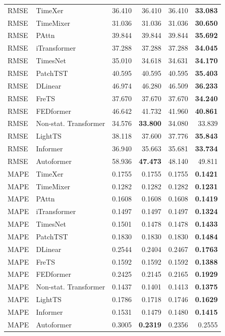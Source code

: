 \begin{longtable}{llrrrr}
\midrule
RMSE & TimeXer & 36.410 & 36.410 & 36.410 & \textbf{33.083} \\
RMSE & TimeMixer & 31.036 & 31.036 & 31.036 & \textbf{30.650} \\
RMSE & PAttn & 39.844 & 39.844 & 39.844 & \textbf{35.692} \\
RMSE & iTransformer & 37.288 & 37.288 & 37.288 & \textbf{34.045} \\
RMSE & TimesNet & 35.010 & 34.618 & 34.631 & \textbf{34.170} \\
RMSE & PatchTST & 40.595 & 40.595 & 40.595 & \textbf{35.403} \\
RMSE & DLinear & 46.974 & 46.280 & 46.509 & \textbf{36.233} \\
RMSE & FreTS & 37.670 & 37.670 & 37.670 & \textbf{34.240} \\
RMSE & FEDformer & 46.642 & 41.732 & 41.960 & \textbf{40.861} \\
RMSE & Non-stat. Transformer & 34.576 & \textbf{33.800} & 34.080 & 33.839 \\
RMSE & LightTS & 38.118 & 37.600 & 37.776 & \textbf{35.843} \\
RMSE & Informer & 36.940 & 35.663 & 35.681 & \textbf{33.734} \\
RMSE & Autoformer & 58.936 & \textbf{47.473} & 48.140 & 49.811 \\
\midrule
MAPE & TimeXer & 0.1755 & 0.1755 & 0.1755 & \textbf{0.1421} \\
MAPE & TimeMixer & 0.1282 & 0.1282 & 0.1282 & \textbf{0.1231} \\
MAPE & PAttn & 0.1608 & 0.1608 & 0.1608 & \textbf{0.1419} \\
MAPE & iTransformer & 0.1497 & 0.1497 & 0.1497 & \textbf{0.1324} \\
MAPE & TimesNet & 0.1501 & 0.1478 & 0.1478 & \textbf{0.1433} \\
MAPE & PatchTST & 0.1830 & 0.1830 & 0.1830 & \textbf{0.1484} \\
MAPE & DLinear & 0.2544 & 0.2404 & 0.2467 & \textbf{0.1763} \\
MAPE & FreTS & 0.1592 & 0.1592 & 0.1592 & \textbf{0.1388} \\
MAPE & FEDformer & 0.2425 & 0.2145 & 0.2165 & \textbf{0.1929} \\
MAPE & Non-stat. Transformer & 0.1437 & 0.1401 & 0.1413 & \textbf{0.1375} \\
MAPE & LightTS & 0.1786 & 0.1718 & 0.1746 & \textbf{0.1629} \\
MAPE & Informer & 0.1531 & 0.1479 & 0.1480 & \textbf{0.1415} \\
MAPE & Autoformer & 0.3005 & \textbf{0.2319} & 0.2356 & 0.2555 \\
\end{longtable}
\endgroup


